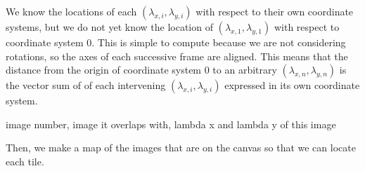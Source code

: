 \documentclass[]{article}
\begin{document}
We know the locations of each $(\lambda_{x,i},\lambda_{y,i})$ with respect to their own coordinate systems, but we do not yet know the location of $(\lambda_{x,1},\lambda_{y,1})$ with respect to coordinate system 0. This is simple to compute because we are not considering rotations, so the axes of each successive frame are aligned. This means that the distance from the origin of coordinate system 0 to an arbitrary $(\lambda_{x,n},\lambda_{y,n})$ is the vector sum of of each intervening $(\lambda_{x,i},\lambda_{y,i})$ expressed in its own coordinate system. 



image number, image it overlaps with, lambda x and lambda y of this image

Then, we make a map of the images that are on the canvas so that we can locate each tile.
\end{document}
